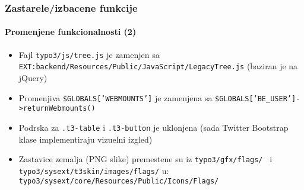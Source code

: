 \begin{frame}[fragile]
	\frametitle{Zastarele/izbacene funkcije}
	\framesubtitle{Promenjene funkcionalnosti (2)}

	\begin{itemize}

		\item Fajl
			\small\texttt{typo3/js/tree.js}\normalsize\space
			je zamenjen sa
			\small\texttt{EXT:backend/Resources/Public/JavaScript/LegacyTree.js}\normalsize\newline
			(baziran je na jQuery)

		\item Promenjiva
			\small\texttt{\$GLOBALS['WEBMOUNTS']}\normalsize\space
			je zamenjena sa
			\small\texttt{\$GLOBALS['BE\_USER']->returnWebmounts()}\normalsize

		\item Podrska za
			\small\texttt{.t3-table}\normalsize\space
			i
			\small\texttt{.t3-button}\normalsize\space
			je uklonjena\newline
			\small
				(sada Twitter Bootstrap klase implementiraju vizuelni izgled)
			\normalsize

		\item Zastavice zemalja (PNG slike) premestene su iz
			\small\texttt{typo3/gfx/flags/ }\normalsize
			i
			\small\texttt{typo3/sysext/t3skin/images/flags/}\normalsize\newline
			u: \small\texttt{typo3/sysext/core/Resources/Public/Icons/Flags/}\normalsize

	\end{itemize}

\end{frame}


